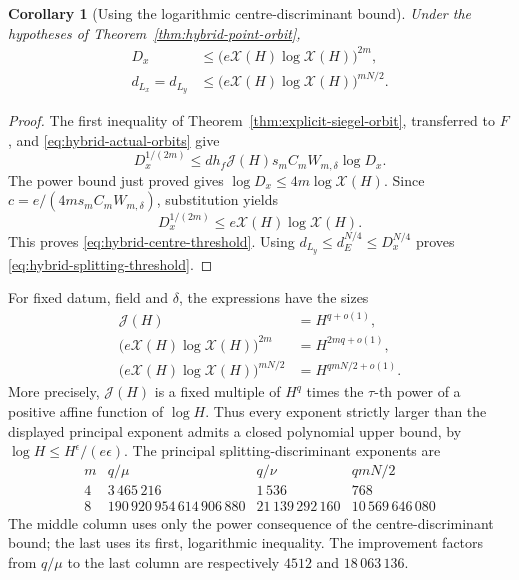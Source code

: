 \documentclass[11pt]{article}
\newtheorem{corollary}[theorem]{Corollary}
\theoremstyle{definition}
\theoremstyle{remark}
\begin{document}
\begin{corollary}[Using the logarithmic centre-discriminant bound]
\label{cor:hybrid-log-centre}
Under the hypotheses of Theorem~\ref{thm:hybrid-point-orbit},
\begin{align}
 D_x&\leq
       \bigl(e\mathcal X(H)\log\mathcal X(H)\bigr)^{2m},
 \label{eq:hybrid-centre-threshold}\\
 d_{L_x}=d_{L_y}&\leq
       \bigl(e\mathcal X(H)\log\mathcal X(H)\bigr)^{mN/2}.
 \label{eq:hybrid-splitting-threshold}
\end{align}
\end{corollary}

\begin{proof}
The first inequality of Theorem~\ref{thm:explicit-siegel-orbit},
transferred to $F$, and \eqref{eq:hybrid-actual-orbits} give
\[
 D_x^{1/(2m)}
 \leq d h_f\mathcal J(H)s_m C_m W_{m,\delta}\log D_x.
\]
The power bound just proved gives
$\log D_x\leq4m\log\mathcal X(H)$.  Since
$c=e/(4m s_m C_m W_{m,\delta})$, substitution yields
\[
 D_x^{1/(2m)}
 \leq e\mathcal X(H)\log\mathcal X(H).
\]
This proves \eqref{eq:hybrid-centre-threshold}.
Using $d_{L_y}\leq d_E^{N/4}\leq D_x^{N/4}$ proves
\eqref{eq:hybrid-splitting-threshold}.
\end{proof}

For fixed datum, field and $\delta$, the expressions have the sizes
\begin{align*}
 \mathcal J(H)&=H^{q+o(1)},\\
 \bigl(e\mathcal X(H)\log\mathcal X(H)\bigr)^{2m}
    &=H^{2mq+o(1)},\\
 \bigl(e\mathcal X(H)\log\mathcal X(H)\bigr)^{mN/2}
    &=H^{qmN/2+o(1)}.
\end{align*}
More precisely, $\mathcal J(H)$ is a fixed multiple of
$H^q$ times the $\tau$-th power of a positive affine function of
$\log H$.  Thus every exponent strictly larger than the displayed
principal exponent admits a closed polynomial upper bound, by
$\log H\leq H^\epsilon/(e\epsilon)$.
The principal splitting-discriminant exponents are
\[
\begin{array}{c|r|r|r}
 m&q/\mu&q/\nu&qmN/2\\ \hline
 4&3\,465\,216&1\,536&768\\
 8&190\,920\,954\,614\,906\,880&21\,139\,292\,160&
      10\,569\,646\,080
\end{array}
\]
The middle column uses only the power consequence of the centre-discriminant bound;
the last uses its first, logarithmic inequality.  The improvement
factors from $q/\mu$ to the last column are respectively
$4512$ and $18\,063\,136$.
\end{document}

